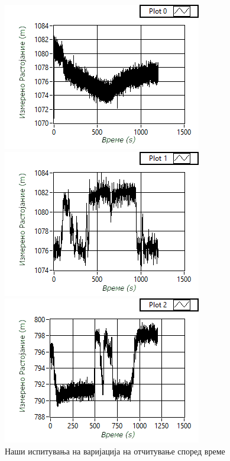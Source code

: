\documentclass[12pt]{article}
\begin{document}
    \begin{figure}[H]
      \centering
      \begin{minipage}{0.45\linewidth}
        \centering
        \includegraphics[width = \textwidth]{./images/kinect_graph_1_mk.png}
      \end{minipage}
      \begin{minipage}{0.45\linewidth}
          \centering
          \includegraphics[width = \textwidth]{./images/kinect_graph_2_mk.png}
        \end{minipage}
      \includegraphics[width = 0.45\linewidth]{./images/kinect_graph_3_mk.png}
      \caption{Наши испитувања на варијација на отчитување според време}
      \end{figure}
\end{document}
